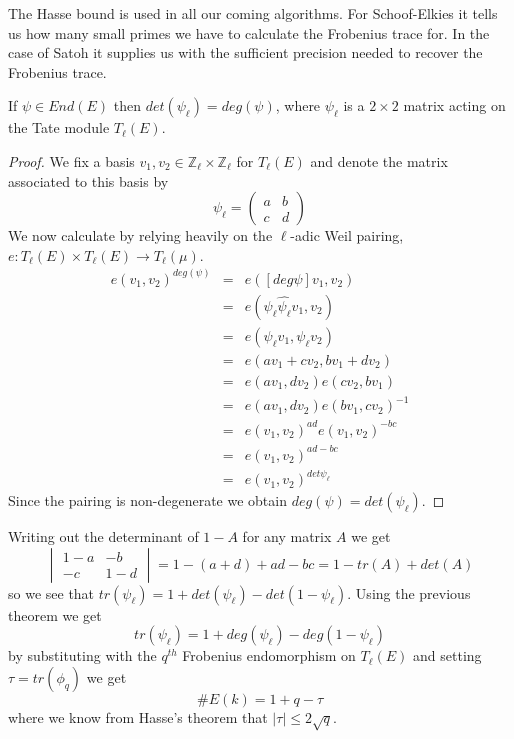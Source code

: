 The Hasse bound is used in all our coming algorithms. For Schoof-Elkies it tells us how many
small primes we have to calculate the Frobenius trace for. In the case of Satoh it supplies us
with the sufficient precision needed to recover the Frobenius trace.

\begin{prop} 
 If $\psi \in End(E)$ then $det(\psi_\ell) = deg(\psi)$, where $\psi_\ell$ is a $2\times2$ matrix acting
on the Tate module $T_\ell(E)$.
\label{detdeg}
\end{prop}
\begin{proof}
 We fix a basis $v_1,v_2 \in \mathbb{Z}_\ell \times \mathbb{Z}_\ell$ for $T_\ell(E)$ and denote the matrix
associated to this basis by
$$ \psi_\ell = \begin{pmatrix} a & b \\ c & d \end{pmatrix} $$
We now calculate by relying heavily on the $\ell$-adic Weil pairing,
$e: T_\ell(E) \times T_\ell(E) \rightarrow T_\ell(\mu)$.
\begin{eqnarray}
 e(v_1, v_2)^{deg(\psi)} &=& e([deg \psi]v_1, v_2) \nonumber \\
			 &=& e(\psi_\ell \widehat{\psi_\ell} v_1, v_2) \nonumber \\
			 &=& e(\psi_\ell v_1, \psi_\ell v_2) \nonumber \\
			 &=& e(a v_1 + c v_2, b v_1 + d v_2) \nonumber \\
			 &=& e(a v_1, d v_2) e(c v_2, b v_1) \nonumber \\
			 &=& e(a v_1, d v_2) e(b v_1, c v_2)^{-1} \nonumber \\
			 &=& e(v_1, v_2)^{ad} e(v_1, v_2)^{-bc} \nonumber \\
			 &=& e(v_1, v_2)^{ad - bc} \nonumber \\
			 &=& e(v_1, v_2)^{det \psi_\ell} \nonumber
\end{eqnarray}
Since the pairing is non-degenerate we obtain $deg(\psi) = det(\psi_\ell)$.
\end{proof}

Writing out the determinant of $1-A$ for any matrix $A$ we get
$$ \begin{vmatrix} 1-a & -b \\ -c & 1-d \end{vmatrix} = 1-(a+d)+ad-bc = 1-tr(A)+det(A) $$
so we see that $tr(\psi_\ell) = 1 + det(\psi_\ell) - det(1-\psi_\ell)$. Using the previous theorem we
get $$tr(\psi_\ell) = 1 + deg(\psi_\ell) - deg(1-\psi_\ell)$$ by substituting with the $q^{th}$ 
Frobenius endomorphism on $T_\ell(E)$ and setting $\tau = tr(\phi_q)$ we get
$$\#E(k) = 1 + q - \tau$$
where we know from Hasse's theorem that $|\tau| \leq 2\sqrt{q}$.

